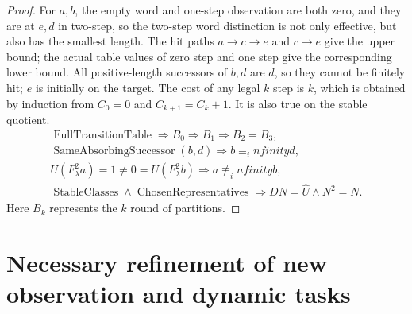 \documentclass[12pt,a4paper,openany,notitlepage]{report}
\theoremstyle{plain}
\theoremstyle{definition}
\theoremstyle{remark}
\def\mathcal#1{#1}\def\mathsf#1{#1}\def\mathbb#1{#1}%
\def\infty{infinity}\def\Gamma{Gamma}\def\Phi{Phi}%
\begin{document}
\begin{CJK*}
\begin{proof}
For $a,b$, the empty word and one-step observation are both zero, and they are at $e,d$ in two-step, so the two-step word distinction is not only effective, but also has the smallest length. The hit paths $a\to c\to e$ and $c\to e$ give the upper bound; the actual table values of zero step and one step give the corresponding lower bound. All positive-length successors of $b,d$ are $d$, so they cannot be finitely hit; $e$ is initially on the target. The cost of any legal $k$ step is $k$, which is obtained by induction from $C_0=0$ and $C_{k+1}=C_k+1$. It is also true on the stable quotient. \[
\begin{gathered}
 \operatorname{FullTransitionTable}
 \Rightarrow\mathcal B_0\Rightarrow\mathcal B_1\Rightarrow\mathcal B_2=\mathcal B_3,\\
 \operatorname{SameAbsorbingSuccessor}(b,d)
 \Rightarrow b\equiv_\infty d,\\
 U(F_\lambda^2a)=1\ne0=U(F_\lambda^2b)
 \Rightarrow a\not\equiv_\infty b,\\
 \operatorname{StableClasses}\land\operatorname{ChosenRepresentatives}
 \Rightarrow DN=\widehat U\land N^2=N.
\end{gathered}
\] Here $\mathcal B_k$ represents the $k$ round of partitions.\end{proof}


\section { Necessary refinement of new observation and dynamic tasks }\label{exp:gov:new-observation-section}



\end{CJK*}
\end{document}
